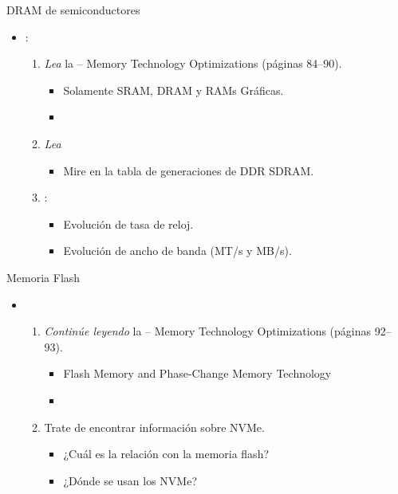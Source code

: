 \begin{frame}[t]{DRAM de semiconductores}
  \begin{itemize}
    \item {}:
      \begin{enumerate}
        \item \emph{Lea} la  -- 
              Memory Technology Optimizations (páginas 84--90).
          \begin{itemize}
            \item Solamente SRAM, DRAM y RAMs Gráficas.
            \item \bibhennessy
          \end{itemize}

        \item \emph{Lea} 
          \begin{itemize}
            \item Mire en la tabla de generaciones de DDR SDRAM.
          \end{itemize}

        \item {}:
          \begin{itemize}
            \item Evolución de tasa de reloj.
            \item Evolución de ancho de banda (MT/s y MB/s).
          \end{itemize}
      \end{enumerate}
  \end{itemize}
\end{frame}

\begin{frame}[t]{Memoria Flash}
  \begin{itemize}
    \item {}
      \begin{enumerate}
        \item \emph{Continúe leyendo} la  -- 
              Memory Technology Optimizations (páginas 92--93).
          \begin{itemize}
            \item Flash Memory and Phase-Change Memory Technology
            \item \bibhennessy
          \end{itemize}

        \item Trate de encontrar información sobre NVMe.
          \begin{itemize}
            \item ¿Cuál es la relación con la memoria flash?
            \item ¿Dónde se usan los NVMe?
          \end{itemize}
      \end{enumerate}
  \end{itemize}
\end{frame}

